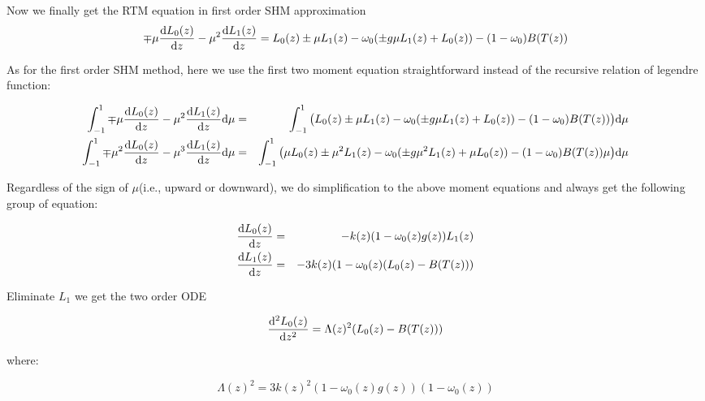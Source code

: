 Now we finally get the RTM equation in first order SHM approximation 
\begin{equation}
    \mp \mu \frac{\mathrm{d} L_{0}(z)}{\mathrm{d} z} - \mu^{2} \frac{\mathrm{d} L_{1}(z)}{\mathrm{d} z}
    = L_{0}(z) \pm \mu L_{1}(z) 
    - \omega_{0}(\pm g \mu L_{1}(z) + L_{0}(z))
    - (1-\omega_{0})B(T(z))
\end{equation}

As for the first order SHM method, here we use the first two moment equation straightforward 
instead of the recursive relation of legendre function:

\begin{eqnarray}
    \int_{-1}^{1}\mp \mu \frac{\mathrm{d} L_{0}(z)}{\mathrm{d} z} - \mu^{2} \frac{\mathrm{d} L_{1}(z)}{\mathrm{d} z} \mathrm{d} \mu
    & = & \int_{-1}^{1}
    \big(
        L_{0}(z) \pm \mu L_{1}(z) 
    - \omega_{0}(\pm g \mu L_{1}(z) + L_{0}(z))
    - (1-\omega_{0})B(T(z)) 
    \big) \mathrm{d} \mu \nonumber\\
    \int_{-1}^{1}\mp \mu^{2} \frac{\mathrm{d} L_{0}(z)}{\mathrm{d} z} - \mu^{3} \frac{\mathrm{d} L_{1}(z)}{\mathrm{d} z} \mathrm{d} \mu
    & = & \int_{-1}^{1}
    \big(
        \mu L_{0}(z) \pm \mu^{2} L_{1}(z) 
    - \omega_{0}(\pm g \mu^{2} L_{1}(z) + \mu L_{0}(z))
    - (1-\omega_{0})B(T(z)) \mu 
    \big) \mathrm{d} \mu \nonumber
\end{eqnarray}

Regardless of the sign of $\mu$(i.e., upward or downward), 
we do simplification to the above moment equations and always get the following group
of equation:

\begin{eqnarray} \label{eq:ODEs}
    \frac{\mathrm{d} L_{0}(z)}{\mathrm{d} z} & = & -k(z)(1-\omega_{0}(z)g(z))L_{1}(z) \nonumber\\
    \frac{\mathrm{d} L_{1}(z)}{\mathrm{d} z} & = & -3k(z)(1-\omega_{0}(z)(L_{0}(z) - B(T(z)))
\end{eqnarray}

Eliminate $L_{1}$ we get the two order ODE

\begin{equation} \label{eq:ODE}
    \frac{\mathrm{d}^{2}L_{0}(z)}{\mathrm{d} z ^{2}} = \Lambda(z)^{2}(L_{0}(z) - B(T(z)))
\end{equation}

where:

\begin{equation} \label{eq:Lamda}
    \Lambda(z)^{2} = 3k(z)^{2}(1-\omega_{0}(z)g(z))(1-\omega_{0}(z))
\end{equation}

